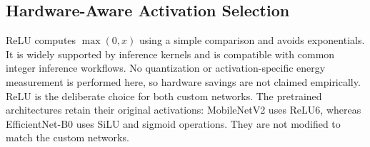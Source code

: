 \subsection{Hardware-Aware Activation Selection}
ReLU computes $\max(0,x)$ using a simple comparison and avoids exponentials.
It is widely supported by inference kernels and is compatible with common
integer inference workflows. No quantization or activation-specific energy
measurement is performed here, so hardware savings are not claimed empirically.
ReLU is the deliberate choice for both custom networks. The pretrained
architectures retain their original activations: MobileNetV2 uses ReLU6,
whereas EfficientNet-B0 uses SiLU and sigmoid operations. They are not modified
to match the custom networks.
